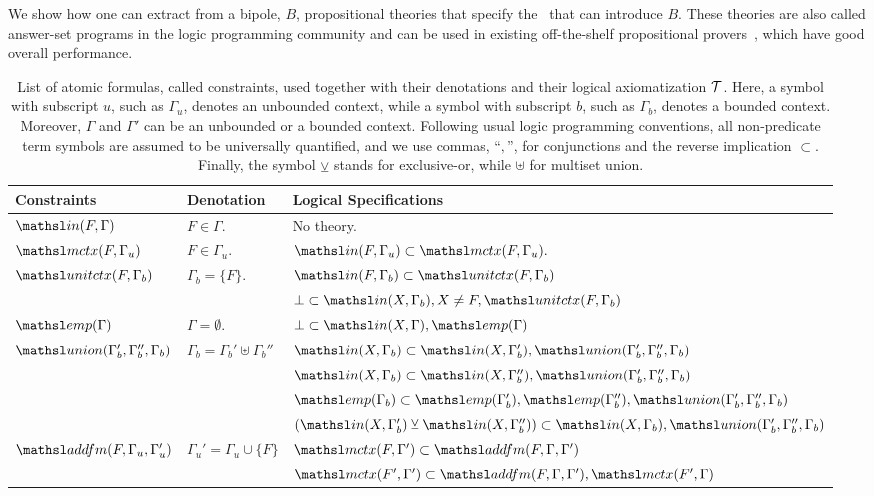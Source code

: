 We show how one
can extract from a bipole, $B$, propositional theories that specify the
\bDers\ that can introduce $B$. These theories are also called answer-set
programs in the logic programming community and can be used in
existing off-the-shelf propositional
provers~\cite{niemela97lpmnr,leone06tcl}, which have good overall
performance.

\newcommand\xor{\veebar}
\newcommand\thSeq{\ensuremath{\Tscr}}
\newcommand\groundSet{\ensuremath{\mathcal{B}}}
\begin{table}[t]
 \caption{\small List of atomic formulas, called constraints, used together
with their denotations and their logical axiomatization $\thSeq$. Here,
a symbol with subscript $u$, such as $\Gamma_u$, denotes an unbounded
context, while a symbol with subscript $b$, such as $\Gamma_b$, denotes a
bounded context. Moreover, $\Gamma$ and $\Gamma'$ can be an unbounded or
a bounded context. Following usual logic programming conventions, all
non-predicate
term symbols are assumed to be universally quantified, and we use commas,
``$,$'', for conjunctions and the reverse implication $\subset$. Finally,
the symbol $\xor$ stands for exclusive-or, while $\uplus$ for multiset
union.}
\label{fig:predicates}
\begin{tabular}{l@{\quad}p{2cm}@{\quad}l}
\toprule
Constraints & Denotation & Logical Specifications \\[1pt]
\midrule
$\In{F}{\Gamma}$ & $F \in \Gamma$. & No theory.\\
\midrule
$\mctx{F}{\Gamma_u}$ &  $F \in \Gamma_u$. & $\In{F}{\Gamma_u}
\subset \mctx{F}{\Gamma_u}.$\\
\midrule
$\elin{F}{\Gamma_b}$ &  $\Gamma_b =
\{F\}$. &   $\In{F}{\Gamma_b} \subset \elin{F}{\Gamma_b}$ \\[1pt]
& &  $\bot \subset \In{X}{\Gamma_b}, X \neq F,
\elin{F}{\Gamma_b}$ \\
\midrule
$\emp{\Gamma}$ &  $\Gamma = \emptyset$. & $\bot \subset
\In{X}{\Gamma}, \emp{\Gamma}$\\
\midrule
$\union{\Gamma_b'} {\Gamma_b''} {\Gamma_b}$ & 
$\Gamma_b = \Gamma_b' \uplus \Gamma_b''$
& $\In{X}{\Gamma_b} \subset \In{X}{\Gamma_b'},
\union{\Gamma_b'}{\Gamma_b''}{\Gamma_b}$ \\[1pt]
&& $\In{X}{\Gamma_b} \subset \In{X}{\Gamma_b''},
\union{\Gamma_b'}{\Gamma_b''}{\Gamma_b}$ \\[1pt]
&& $\emp{\Gamma_b}  \subset
\emp{\Gamma_b'},\emp{\Gamma_b''},
\union{\Gamma_b'}{\Gamma_b''}{\Gamma_b}$\\[1pt]
&& $(\In{X}{\Gamma_b'} \xor \In{X}{\Gamma_b''})  \subset
\In{X}{\Gamma_b}, \union{\Gamma_b'}{\Gamma_b''}{\Gamma_b}$\\
\midrule
$\addform{F}{\Gamma_u}{\Gamma_u'}$ &  
$\Gamma_u' = \Gamma_u \cup \{F\}$ & 
$\mctx{F}{\Gamma'} \subset \addform{F}{\Gamma}{\Gamma'}$ \\[1pt]
&& $\mctx{F'}{\Gamma'} \subset \addform{F}{\Gamma}{\Gamma'},
\mctx{F'}{\Gamma}$ \\
\bottomrule
\end{tabular}
\vspace{-4mm}
\end{table}


